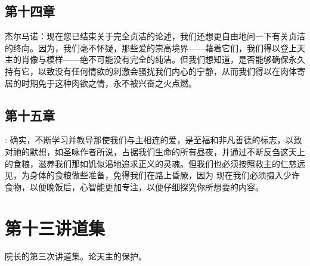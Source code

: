
\subsection{第十四章}

\par

杰尔马诺：现在您已结束关于完全贞洁的论述，我们还想更自由地问一下有关贞洁的终向。因为，我们毫不怀疑，那些爱的崇高境界——藉着它们，我们得以登上天主的肖像与模样——绝不可能没有完全的纯洁。但我们想知道，是否能够确保永久持有它，以致没有任何情欲的刺激会骚扰我们内心的宁静，从而我们得以在肉体寄居的时期免于这种肉欲之情，永不被兴奋之火点燃。\par


\subsection{第十五章}

\par

: 确实，不断学习并教导那使我们与主相连的爱，是至福和非凡善德的标志，以致对祂的默想，如圣咏作者所说，占据我们生命的所有昼夜，并通过不断反刍这天上的食粮，滋养我们那如饥似渴地追求正义的灵魂。但我们也必须按照救主的仁慈远见，为身体的食粮做些准备，免得我们在路上昏厥，因为 现在我们必须摄入少许食物，以便晚饭后，心智能更加专注，以便仔细探究你所想要的内容。\par



\section{第十三讲道集}

\par

院长的第三次讲道集。论天主的保护。\par

